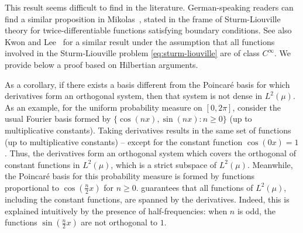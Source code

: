 \documentclass[a4paper,11pt]{article}
\renewcommand{\citet}[2][]{\cite[#1]{#2}}
\theoremstyle{definition}
\theoremstyle{remark}
\theoremstyle{theorem}
\begin{document}
This result seems difficult to find in the literature. German-speaking readers can find a similar proposition in Mikolas~\cite{mikolas1955}, stated in the frame of Sturm-Liouville theory for twice-differentiable functions satisfying boundary conditions. 
See also Kwon and Lee~\citet{Kwon2003} for a similar result under the assumption that all functions involved in the Sturm-Liouville problem \cref{eq:sturm-liouville} are of class $C^\infty$.
We provide below a proof based on Hilbertian arguments. 

As a corollary, if there exists a basis different from the Poincar\'e basis for which derivatives form an orthogonal system, then that system is not dense in $L^2(\mu)$. As an example, for the uniform probability measure on $[0, 2\pi]$, consider the usual Fourier basis formed by $\{\cos(nx), \sin(nx): n \geq 0 \}$ (up to multiplicative constants). Taking derivatives results in the same set of functions (up to multiplicative constants) -- except for the constant function $\cos(0x) = 1$.
Thus, the derivatives form an orthogonal system which covers the orthogonal of constant functions in $L^2(\mu)$, which is a strict subspace of $L^2(\mu)$. Meanwhile, the Poincar\'e basis for this probability measure is formed by functions proportional to $\cos\left(\frac{n}{2}x \right)$ for $n \geq 0$.   guarantees that all functions of $L^2(\mu)$, including the constant functions, are spanned by the derivatives. Indeed, this is explained intuitively by the presence of half-frequencies: when $n$ is odd, the functions $\sin \left(\frac{n}{2}x \right)$ are not orthogonal to $1$.
\end{document}
